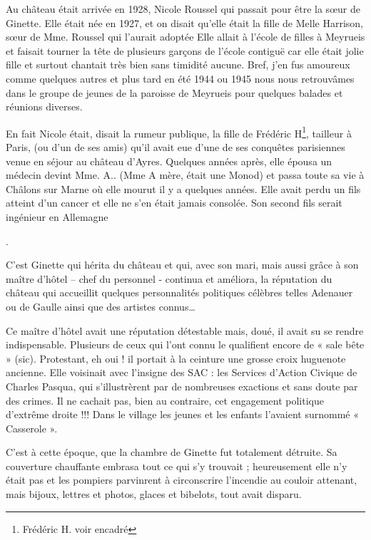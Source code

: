Au château était arrivée en 1928, Nicole Roussel qui passait pour être la sœur de Ginette. Elle
était née en 1927, et on disait qu’elle était la fille de Melle Harrison, sœur de Mme. Roussel
qui l’aurait adoptée Elle allait à l’école de filles à Meyrueis et faisait tourner la tête de
plusieurs garçons de l’école contiguë car elle était jolie fille et surtout chantait très bien sans
timidité aucune. Bref, j’en fus amoureux comme quelques autres et plus tard en été 1944 ou
1945 nous nous retrouvâmes dans le groupe de jeunes de la paroisse de Meyrueis pour
quelques balades et réunions diverses.

\medskip

En fait Nicole était, disait la rumeur publique, la fille de Frédéric H\footnote{Frédéric H. voir encadré}, tailleur à Paris, (ou d’un
de ses amis) qu’il avait eue d’une de ses conquêtes parisiennes venue en séjour au château
d’Ayres. Quelques années après, elle épousa un médecin devint Mme. A.. (Mme A mère, était
une Monod) et passa toute sa vie à Châlons sur Marne où elle mourut il y a quelques années.
Elle avait perdu un fils atteint d’un cancer et elle ne s’en était jamais consolée. Son second fils
serait ingénieur en Allemagne

\medskip

.

C’est Ginette qui hérita du château et qui, avec son mari, mais aussi grâce à son maître d’hôtel
– chef du personnel - continua et améliora, la réputation du château qui accueillit quelques
personnalités politiques célèbres telles Adenauer ou de Gaulle ainsi que des artistes connus…

\medskip

Ce maître d’hôtel avait une réputation détestable mais, doué, il avait su se rendre
indispensable. Plusieurs de ceux qui l’ont connu le qualifient encore de « sale bête » (sic).
Protestant, eh oui ! il portait à la ceinture une grosse croix huguenote ancienne. Elle voisinait
avec l’insigne des SAC : les Services d’Action Civique de Charles Pasqua, qui s’illustrèrent
par de nombreuses exactions et sans doute par des crimes. Il ne cachait pas, bien au contraire,
cet engagement politique d’extrême droite !!! Dans le village les jeunes et les enfants
l’avaient surnommé « Casserole ».

\medskip


\noindent
C’est à cette époque, que la chambre de Ginette fut totalement détruite. Sa couverture
chauffante embrasa tout ce qui s’y trouvait ; heureusement elle n’y était pas et les pompiers
parvinrent à circonscrire l’incendie au couloir attenant, mais bijoux, lettres et photos, glaces et
bibelots, tout avait disparu.


